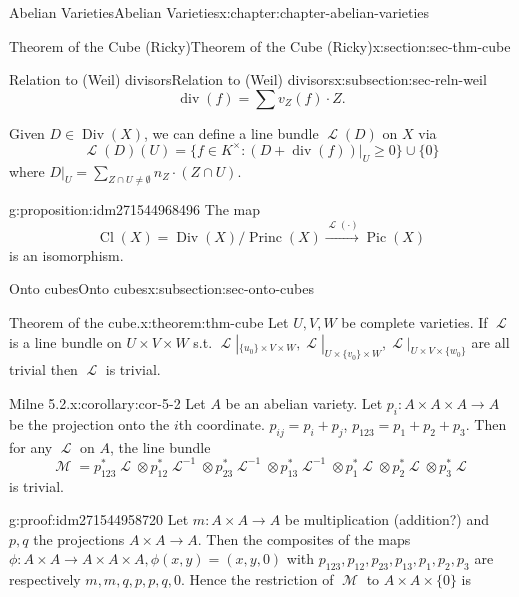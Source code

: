 \documentclass[oneside,10pt,]{book}
\numberwithin{equation}{section}
\newcommand{\sheaf}[1]{\operatorname{\mathcal{#1}}}
\DeclareMathOperator{\divisor}{div}
\DeclareMathOperator{\Div}{Div}
\DeclareMathOperator{\Cl}{Cl}
\DeclareMathOperator{\Pic}{Pic}
\DeclareMathOperator{\Princ}{Princ}
\begin{document}
\begin{chapterptx}{Abelian Varieties}{}{Abelian Varieties}{}{}{x:chapter:chapter-abelian-varieties}
\begin{sectionptx}{Theorem of the Cube (Ricky)}{}{Theorem of the Cube (Ricky)}{}{}{x:section:sec-thm-cube}
\begin{subsectionptx}{Relation to (Weil) divisors}{}{Relation to (Weil) divisors}{}{}{x:subsection:sec-reln-weil}
\begin{equation*}
\divisor (f) = \sum v_Z(f) \cdot Z\text{.}
\end{equation*}
%
\par
Given \(D \in \Div(X)\), we can define a line bundle \(\sheaf L(D)\) on \(X\) via%
\begin{equation*}
\sheaf L(D)(U) = \{f\in K^\times : (D + \divisor (f))|_U\ge 0 \} \cup \{0\}
\end{equation*}
where \(D|_U = \sum_{Z\cap U\ne \emptyset} n_Z\cdot (Z\cap U)\).%
\begin{proposition}{}{}{g:proposition:idm271544968496}%
The map%
\begin{equation*}
\Cl(X) = \Div(X)/\Princ(X) \xrightarrow{\sheaf L(\cdot)} \Pic(X)
\end{equation*}
is an isomorphism.%
\end{proposition}
\end{subsectionptx}
%
%
\typeout{************************************************}
\typeout{************************************************}
%
\begin{subsectionptx}{Onto cubes}{}{Onto cubes}{}{}{x:subsection:sec-onto-cubes}
\begin{theorem}{Theorem of the cube.}{}{x:theorem:thm-cube}%
Let \(U,V,W\) be complete varieties. If \(\sheaf L \) is a line bundle on \(U\times V\times W\) s.t. \(\sheaf L|_{\{u_0\}\times V\times W},\sheaf L|_{U\times \{v_0\}\times W}, \sheaf L|_{U\times V\times \{w_0\}}\) are all trivial then \(\sheaf L\) is trivial.%
\end{theorem}
\begin{corollary}{Milne 5.2.}{}{x:corollary:cor-5-2}%
Let \(A\) be an abelian variety. Let \(p_i\colon A\times A\times A \to A\) be the projection onto the \(i\)th coordinate. \(p_{ij} = p_i+p_j\), \(p_{123} = p_1+p_2+p_3\). Then for any \(\sheaf L\) on \(A\), the line bundle%
\begin{equation*}
\sheaf M  = p_{123}^*\sheaf L \otimes p_{12}^*\sheaf L^{-1}\otimes p_{23}^*\sheaf L^{-1}\otimes p_{13}^*\sheaf L^{-1} \otimes p_1^*\sheaf L \otimes p_2^*\sheaf L \otimes p_3^*\sheaf L
\end{equation*}
is trivial.%
\end{corollary}
\begin{proofptx}{}{g:proof:idm271544958720}
Let  \(m \colon A\times A \to A\) be multiplication (addition?) and \(p,q\) the projections \(A\times A \to A\). Then the composites of the maps \(\phi\colon A\times A \to A \times A \times A, \phi(x,y) = (x,y,0)\) with \(p_{123}, p_{12}, p_{23}, p_{13}, p_1, p_2, p_3\) are respectively \(m,m,q, p, p, q, 0\). Hence the restriction of \(\sheaf M\) to \(A \times A \times \{0\}\) is%

\end{proofptx}
\end{subsectionptx}
\end{sectionptx}
\end{chapterptx}
\end{document}
